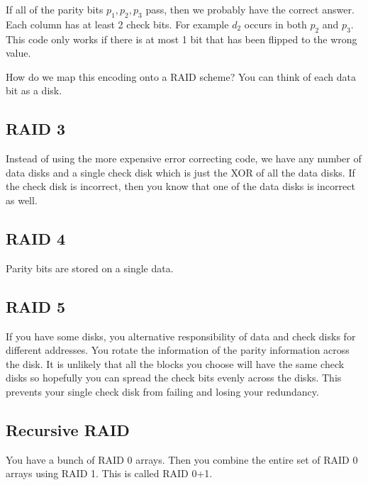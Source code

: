 \documentclass[psamsfonts]{amsart}
\begin{document}
If all of the parity bits $p_1, p_2, p_3$ pass, then we probably have the correct answer. Each column has at least 2 check bits. For example $d_2$ occurs in both $p_2$ and $p_3$. This code only works if there is at most 1 bit that has been flipped to the wrong value.

How do we map this encoding onto a RAID scheme? You can think of each data bit as a disk.

\subsection{RAID 3}

Instead of using the more expensive error correcting code, we have any number of data disks and a single check disk which is just the XOR of all the data disks. If the check disk is incorrect, then you know that one of the data disks is incorrect as well.

\subsection{RAID 4}

Parity bits are stored on a single data.

\subsection{RAID 5}

If you have some disks, you alternative responsibility of data and check disks for different addresses. You rotate the information of the parity information across the disk. It is unlikely that all the blocks you choose will have the same check disks so hopefully you can spread the check bits evenly across the disks. This prevents your single check disk from failing and losing your redundancy.

\subsection{Recursive RAID}

You have a bunch of RAID 0 arrays. Then you combine the entire set of RAID 0 arrays using RAID 1. This is called RAID 0+1.  
\end{document}
